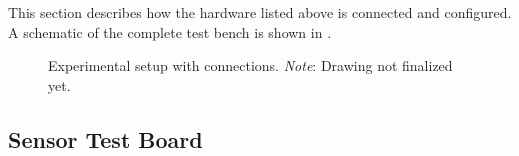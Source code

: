 This  section  describes  how  the  hardware listed  above  is  connected  and
configured. A   schematic   of  the   complete   test   bench  is   shown   in
.

\begin{figure}
    
    \caption{%
        Experimental setup  with connections.  \emph{Note}: Drawing not
        finalized yet.%
    }
    \label{fig:experimentDiagram}
\end{figure}


\subsection{Sensor Test Board}
\label{subsec:testBoard}


